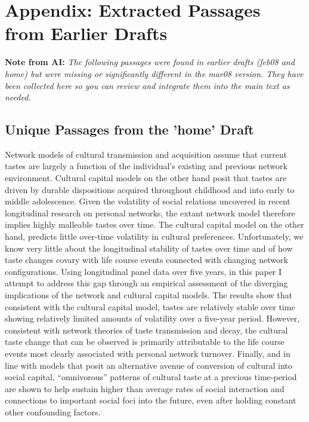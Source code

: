 

\section*{Appendix: Extracted Passages from Earlier Drafts}
\textbf{Note from AI:} \textit{The following passages were found in earlier drafts (feb08 and home) but were missing or significantly different in the mar08 version. They have been collected here so you can review and integrate them into the main text as needed.}

\subsection*{Unique Passages from the 'home' Draft}
Network models of cultural transmission and acquisition assume that current tastes are largely a function of the individual’s existing and previous network environment. Cultural capital models on the other hand posit that tastes are driven by durable dispositions acquired throughout childhood and into early to middle adolescence. Given the volatility of social relations uncovered in recent longitudinal research on personal networks, the extant network model therefore implies highly malleable tastes over time. The cultural capital model on the other hand, predicts little over-time volatility in cultural preferences. Unfortunately, we know very little about the longitudinal stability of tastes over time and of how taste changes covary with life course events connected with changing network configurations. Using longitudinal panel data over five years, in this paper I attempt to address this gap through an empirical assessment of the diverging implications of the network and cultural capital models. The results show that consistent with the cultural capital model, tastes are relatively stable over time showing relatively limited amounts of volatility over a five-year period. However, consistent with network theories of taste transmission and decay, the cultural taste change that can be observed is primarily attributable to the life course events most clearly associated with personal network turnover. Finally, and in line with models that posit an alternative avenue of conversion of cultural into social capital, “omnivorous” patterns of cultural taste at a previous time-period are shown to help sustain higher than average rates of social interaction and connections to important social foci into the future, even after holding constant other confounding factors.

